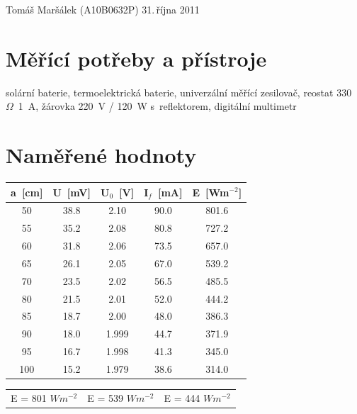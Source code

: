 \documentclass[10pt]{article}
\begin{document}
 {Tomáš Maršálek}
 {(A10B0632P)}
 {31.\,října 2011}


\section{Měřící potřeby a přístroje}
solární baterie, termoelektrická baterie, univerzální měřící zesilovač, reostat
330~$\Omega$~1~A, žárovka 220~V / 120~W s~reflektorem, digitální multimetr

\section{Naměřené hodnoty}

\begin{scriptsize}
\begin{minipage}[t]{.5\textwidth}
\vspace{0pt}
\begin{tabular}[b]{|c|c|c|c||c|}
\hline
a~[cm] & U~[mV] & U$_0$~[V] & I$_f$~[mA] & E~[Wm$^{-2}$] \\
\hline
50  & 38.8 & 2.10  & 90.0 & 801.6 \\
55  & 35.2 & 2.08  & 80.8 & 727.2 \\
60  & 31.8 & 2.06  & 73.5 & 657.0 \\
65  & 26.1 & 2.05  & 67.0 & 539.2 \\
70  & 23.5 & 2.02  & 56.5 & 485.5 \\
80  & 21.5 & 2.01  & 52.0 & 444.2 \\
85  & 18.7 & 2.00  & 48.0 & 386.3 \\
90  & 18.0 & 1.999 & 44.7 & 371.9 \\
95  & 16.7 & 1.998 & 41.3 & 345.0 \\
100 & 15.2 & 1.979 & 38.6 & 314.0 \\
\hline
\end{tabular}
\end{minipage}
\begin{minipage}[t]{.5\textwidth}
\vspace{0pt}
\begin{tabular}[b]{|c|c|c|c|c|c|}
\hline
\multicolumn{2}{|l|}{E = 801 $Wm^{-2}$} & 
\multicolumn{2}{l|}{E = 539 $Wm^{-2}$} &
\multicolumn{2}{l|}{E = 444 $Wm^{-2}$} \\


\end{tabular}
\end{minipage}
\end{scriptsize}
\end{document}
